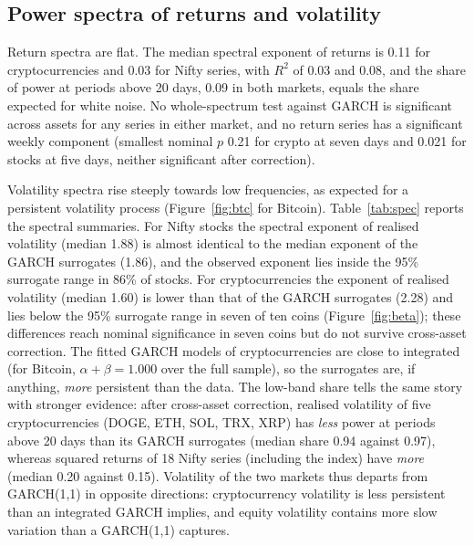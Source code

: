 \documentclass[11pt,a4paper]{article}
\begin{document}
\subsection{Power spectra of returns and volatility}

Return spectra are flat. The median spectral exponent of returns is 0.11 for cryptocurrencies and 0.03 for Nifty
series, with $R^2$ of 0.03 and 0.08, and the share of power at periods above 20 days, 0.09 in both markets, equals the
share expected for white noise. No whole-spectrum test against GARCH is significant across assets for any series in
either market, and no return series has a significant weekly component (smallest nominal $p$ 0.21 for crypto at
seven days and 0.021 for stocks at five days, neither significant after correction).

Volatility spectra rise steeply towards low frequencies, as expected for a persistent volatility process
(Figure~\ref{fig:btc} for Bitcoin). Table~\ref{tab:spec} reports the spectral summaries. For Nifty stocks the
spectral exponent of realised volatility (median 1.88) is almost identical to the median exponent of the GARCH
surrogates (1.86), and the observed exponent lies inside the 95\% surrogate range in 86\% of stocks. For
cryptocurrencies the exponent of realised volatility (median 1.60) is lower than that of the GARCH surrogates (2.28)
and lies below the 95\% surrogate range in seven of ten coins (Figure~\ref{fig:beta}); these differences reach
nominal significance in seven coins but do not survive cross-asset correction. The fitted GARCH models of
cryptocurrencies are close to integrated (for Bitcoin, $\alpha+\beta=1.000$ over the full sample), so the surrogates
are, if anything, \emph{more} persistent than the data. The low-band share tells the same story with stronger
evidence: after cross-asset correction, realised volatility of five cryptocurrencies (DOGE, ETH, SOL, TRX, XRP) has
\emph{less} power at periods above 20 days than its GARCH surrogates (median share 0.94 against 0.97), whereas squared
returns of 18 Nifty series (including the index) have \emph{more} (median 0.20 against 0.15). Volatility of the two
markets thus departs from GARCH(1,1) in opposite directions: cryptocurrency volatility is less persistent than an
integrated GARCH implies, and equity volatility contains more slow variation than a GARCH(1,1) captures.
\end{document}
